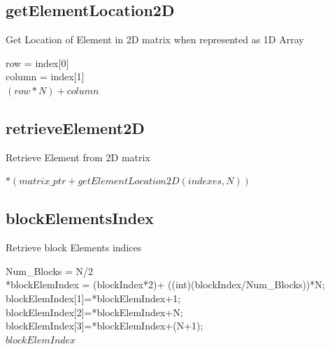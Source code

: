 \documentclass[10pt, onecolumn]{article}
\begin{document}
\subsection{getElementLocation2D}

    \begin{algorithm}[H]
        \label{Alg:getElementLocation2D}
        \caption{Get Location of Element in 2D matrix when represented as 1D Array}
        row = index[0]\\
        column = index[1]\\
        \Return $(row*N)+column$
    \end{algorithm}
\subsection{retrieveElement2D}

    \begin{algorithm}[H]
        \label{Alg:retrieveElement2D}
        \caption{Retrieve Element from 2D matrix}
        \Return $*(matrix\_ptr + getElementLocation2D(indexes, N))$
    \end{algorithm}
%
\subsection{blockElementsIndex}

    \begin{algorithm}[H]
        \label{Alg:blockElementsIndex}
        \caption{Retrieve block Elements indices}
        Num\_Blocks = N/2\\
        *blockElemIndex =  (blockIndex*2)+ ((int)(blockIndex/Num\_Blocks))*N;\\
	    blockElemIndex[1]=*blockElemIndex+1; \\
	    blockElemIndex[2]=*blockElemIndex+N;\\
	    blockElemIndex[3]=*blockElemIndex+(N+1);\\
        \Return $blockElemIndex$
    \end{algorithm}
%
\end{document}
